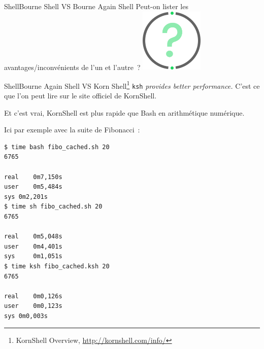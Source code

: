 \documentclass{beamer}
\begin{document}
    \begin{frame}{Shell}{Bourne Shell VS Bourne Again Shell}
        Peut-on lister les avantages/inconvénients de l'un et l'autre~?
        \bigbreak
        \centering
        \includegraphics[width=3cm]{image/question-mark}
    \end{frame}

    \begin{frame}[fragile]{Shell}{Bourne Again Shell VS Korn Shell\footnote{KornShell Overview, \url{http://kornshell.com/info/}}}
        \lstinline{ksh}\textit{ provides better performance.} C'est ce que l'on peut lire sur le site officiel de KornShell.

        Et c'est vrai, KornShell est plus rapide que Bash en arithmétique numérique.

        Ici par exemple avec la suite de Fibonacci~:
        \begin{lstlisting}[language=bash]
$ time bash fibo_cached.sh 20
6765

real	0m7,150s
user	0m5,484s
sys	0m2,201s
$ time sh fibo_cached.sh 20
6765

real    0m5,048s
user    0m4,401s
sys     0m1,051s
$ time ksh fibo_cached.ksh 20
6765

real	0m0,126s
user	0m0,123s
sys	0m0,003s
        \end{lstlisting}
    \end{frame}
\end{document}
